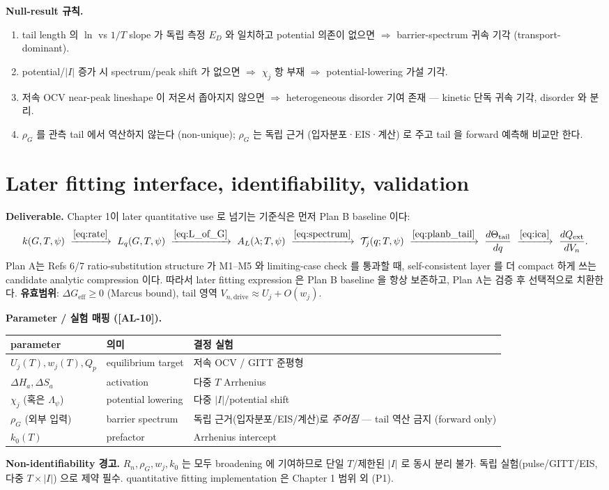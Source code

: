 \documentclass[11pt,a4paper]{article}
\newcommand{\eff}{\mathrm{eff}}
\newcommand{\dimedrive}{\mathrm{drive}}
\newcommand{\ext}{\mathrm{ext}}
\newcommand{\AL}[1]{\textsf{[AL-#1]}}
\begin{document}
\textbf{Null-result 규칙.}
\begin{enumerate}[label=(N\arabic*)]
\item tail length 의 $\ln$ vs $1/T$ slope 가 독립 측정 $E_D$ 와 일치하고 potential 의존이
  없으면 $\Rightarrow$ barrier-spectrum 귀속 기각 (transport-dominant).
\item potential/$|I|$ 증가 시 spectrum/peak shift 가 없으면 $\Rightarrow$ $\chi_j$ 항 부재
  $\Rightarrow$ potential-lowering 가설 기각.
\item 저속 OCV near-peak lineshape 이 저온서 좁아지지 않으면 $\Rightarrow$ heterogeneous
  disorder 기여 존재 — kinetic 단독 귀속 기각, disorder 와 분리.
\item $\rho_G$ 를 관측 tail 에서 역산하지 않는다 (non-unique); $\rho_G$ 는 독립 근거
  (입자분포·EIS·계산) 로 주고 tail 을 forward 예측해 비교만 한다.
\end{enumerate}

\section{Later fitting interface, identifiability, validation}\label{sec:fitting}
\textbf{Deliverable.} Chapter 1이 later quantitative use 로 넘기는 기준식은 먼저 Plan B
baseline 이다:
\[
k(G,T,\psi)\ \xrightarrow{\eqref{eq:rate}}\ 
L_q(G,T,\psi)\ \xrightarrow{\eqref{eq:L_of_G}}\ 
A_L(\lambda;T,\psi)\ \xrightarrow{\eqref{eq:spectrum}}\ 
\mathcal T_j(q;T,\psi)\ \xrightarrow{\eqref{eq:planb_tail}}\ 
\frac{d\Theta_\mathrm{tail}}{dq}\ \xrightarrow{\eqref{eq:ica}}\ 
\frac{dQ_\ext}{dV_n}.
\]
Plan A는 Refs 6/7 ratio-substitution structure 가 M1--M5 와 limiting-case check 를 통과할 때,
self-consistent layer 를 더 compact 하게 쓰는 candidate analytic compression 이다. 따라서 later
fitting expression 은 Plan B baseline 을 항상 보존하고, Plan A는 검증 후 선택적으로 치환한다.
\textbf{유효범위}: $\Delta G_\eff\ge0$ (Marcus bound), tail 영역
$V_{n,\dimedrive}\approx U_j+O(w_j)$.

\textbf{Parameter / 실험 매핑 (\AL{10}).}
\begin{longtable}{p{0.26\textwidth} p{0.30\textwidth} p{0.38\textwidth}}
\toprule parameter & 의미 & 결정 실험 \\ \midrule \endhead
$U_j(T),w_j(T),Q_p$ & equilibrium target & 저속 OCV / GITT 준평형 \\
$\Delta H_a,\Delta S_a$ & activation & 다중 $T$ Arrhenius \\
$\chi_j$ (혹은 $\Lambda_\psi$) & potential lowering & 다중 $|I|$/potential shift \\
$\rho_G$ (외부 입력) & barrier spectrum & 독립 근거(입자분포/EIS/계산)로 \emph{주어짐} — tail 역산 금지 (forward only) \\
$k_0(T)$ & prefactor & Arrhenius intercept \\
\bottomrule
\end{longtable}
\textbf{Non-identifiability 경고.} $R_n,\rho_G,w_j,k_0$ 는 모두 broadening 에 기여하므로
단일 $T$/제한된 $|I|$ 로 동시 분리 불가. 독립 실험(pulse/GITT/EIS, 다중 $T\times|I|$) 으로
제약 필수. quantitative fitting implementation 은 Chapter 1 범위 외 (P1).
\end{document}
